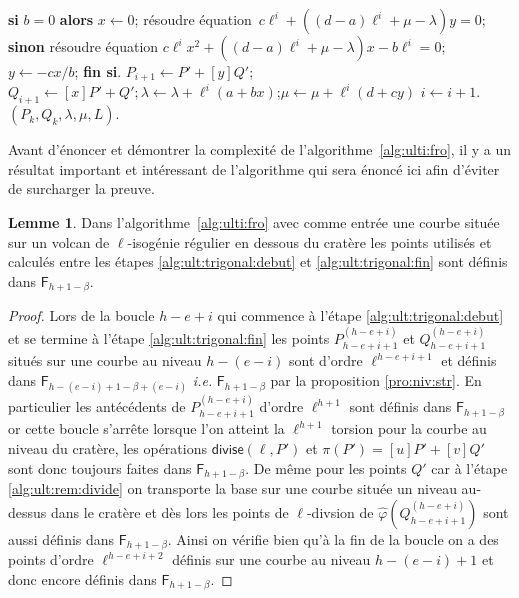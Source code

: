 \documentclass[10pt,a4paper]{book}
\theoremstyle{plain}
\theoremstyle{definition}
\newtheorem{lem}[thm]{Lemme}
\theoremstyle{definition}
\theoremstyle{definition}
\theoremstyle{definition}
\theoremstyle{remark}
\theoremstyle{remark}
\theoremstyle{definition}
\begin{document}
\begin{algorithm}
\begin{algorithmic}[1]
\STATE
  \textbf{si} $b = 0$ \textbf{alors} $x \leftarrow 0$;
  résoudre équation~$c \ell^{i} + ((d-a) \ell^{i} + \mu-\lambda) y = 0$;
\STATE
  \textbf{sinon} résoudre équation
  $c \ell^{i} x^2 + ((d-a) \ell^{i}+ \mu-\lambda) x - b \ell^{i} = 0$;
  $y \leftarrow -cx/b$; \textbf{fin si}.
\STATE
  $P_{i+1} \leftarrow P' + [y] Q'$; $Q_{i+1} \leftarrow [x] P' + Q'; \lambda \leftarrow \lambda + \ell^{i} (a + bx)$;$ \mu \leftarrow \mu + \ell^{i}(d+cy)$
\STATE $i \leftarrow i+1$. 
\ENDWHILE \label{alg:ult:diagonal:fin}
\RETURN $(P_{k},Q_{k},\lambda,\mu,L).$
\end{algorithmic}
\end{algorithm}

Avant d'énoncer et démontrer la complexité de l'algorithme~\ref{alg:ulti:fro}, il y a un résultat important et intéressant de l'algorithme qui sera énoncé ici afin d'éviter de surcharger la preuve.

\begin{lem}
\label{lem:alg:rat}
Dans l'algorithme~\ref{alg:ulti:fro} avec comme entrée une courbe située sur un volcan de $\ell$-isogénie régulier en dessous du cratère les points utilisés et calculés entre les étapes \ref{alg:ult:trigonal:debut} et \ref{alg:ult:trigonal:fin} sont définis dans $\mathsf{F}_{h+1-\beta}$.
\end{lem}

\begin{proof}
Lors de la boucle $h-e+i$ qui commence à l'étape \ref{alg:ult:trigonal:debut} 
et se termine à l'étape \ref{alg:ult:trigonal:fin} les points $P_{h-e+i+1}^{(h-e+i)}$ et 
$Q_{h-e+i+1}^{(h-e+i)}$ situés sur une courbe au niveau $h-(e-i)$ sont d'ordre 
$\ell^{h-e+i+1}$ et définis dans $\mathsf{F}_{h-(e-i)+1-\beta+(e-i)}$ \emph{i.e.} $
\mathsf{F}_{h+1-\beta}$ par la proposition \ref{pro:niv:str}. En particulier les 
 antécédents de $P_{h-e+i+1}^{(h-e+i)}$ d'ordre $\ell^{h+1}$ sont définis dans 
 $ \mathsf{F}_{h+1-\beta}$ or cette boucle s'arrête lorsque l'on atteint
 la $\ell^{h+1}$ torsion pour la courbe au niveau du cratère, les opérations 
 $\mathsf{divise}(\ell, P')$ et $\pi(P')=[u]P'+[v]Q'$ sont donc toujours faites
 dans $ \mathsf{F}_{h+1-\beta}$. De même pour les points $Q'$ car à l'étape 
 \ref{alg:ult:rem:divide} on transporte la base sur une courbe située un niveau
 au-dessus dans le cratère et dès lors les points de $\ell$-divsion de 
 $\widehat{\varphi}(Q_{h-e+i+1}^{(h-e+i)})$ sont aussi définis dans 
 $\mathsf{F}_{h+1-\beta}$. Ainsi on vérifie bien qu'à la fin de la boucle on a
 des points d'ordre $\ell^{h-e+i+2}$ définis sur une courbe au niveau 
 $h-(e-i)+1$ et donc encore définis dans $\mathsf{F}_{h+1-\beta}$.
\end{proof}
\end{document}
